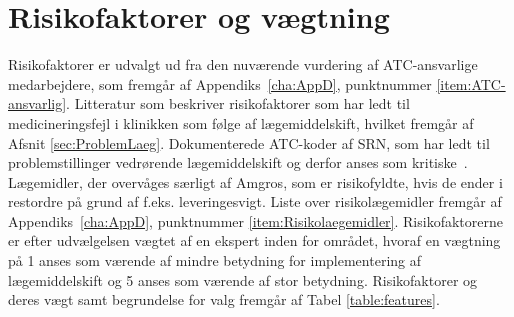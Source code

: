 






\section{Risikofaktorer og vægtning}
Risikofaktorer er udvalgt ud fra den nuværende vurdering af ATC-ansvarlige medarbejdere, som fremgår af Appendiks~\ref{cha:AppD}, punktnummer \ref{item:ATC-ansvarlig}. Litteratur som beskriver risikofaktorer som har ledt til medicineringsfejl i klinikken som følge af lægemiddelskift, hvilket fremgår af Afsnit \ref{sec:ProblemLaeg}. Dokumenterede ATC-koder af SRN, som har ledt til problemstillinger vedrørende lægemiddelskift og derfor anses som kritiske~\citep{SRN}. Lægemidler, der overvåges særligt af Amgros, som er risikofyldte, hvis de ender i restordre på grund af f.eks. leveringesvigt. Liste over risikolægemidler fremgår af Appendiks~\ref{cha:AppD}, punktnummer \ref{item:Risikolaegemidler}. Risikofaktorerne er efter udvælgelsen vægtet af en ekspert inden for området, hvoraf en vægtning på 1 anses som værende af mindre betydning for implementering af lægemiddelskift og 5 anses som værende af stor betydning. Risikofaktorer og deres vægt samt begrundelse for valg fremgår af Tabel \ref{table:features}.

